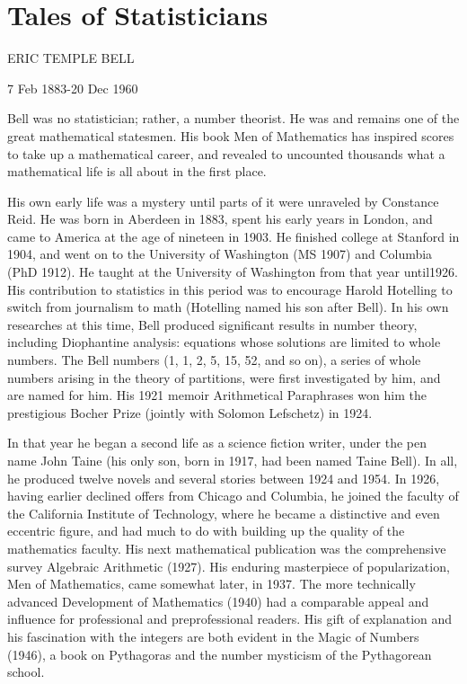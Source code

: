 \documentclass{article}
\begin{document}
\section[Tales of Statisticians]{Tales of Statisticians}
ERIC TEMPLE BELL

7 Feb 1883-20 Dec 1960

Bell was no statistician; rather, a number theorist. He was and remains one of the great mathematical statesmen. His
book Men of Mathematics has inspired scores to take up a mathematical career, and revealed to uncounted thousands what
a mathematical life is all about in the first place. 

His own early life was a mystery until parts of it were unraveled by Constance Reid. He was born in Aberdeen in 1883,
spent his early years in London, and came to America at the age of nineteen in 1903. He finished college at Stanford in
1904, and went on to the University of Washington (MS 1907) and Columbia (PhD 1912). He taught at the University of
Washington from that year until1926. His contribution to statistics in this period was to encourage Harold Hotelling to
switch from journalism to math (Hotelling named his son after Bell). In his own researches at this time, Bell produced
significant results in number theory, including Diophantine analysis: equations whose solutions are limited to whole
numbers. The Bell numbers (1, 1, 2, 5, 15, 52, and so on), a series of whole numbers arising in the theory of
partitions, were first investigated by him, and are named for him. His 1921 memoir Arithmetical Paraphrases won him the
prestigious Bocher Prize (jointly with Solomon Lefschetz) in 1924. 

In that year he began a second life as a science fiction writer, under the pen name John Taine (his only son, born in
1917, had been named Taine Bell). In all, he produced twelve novels and several stories between 1924 and 1954. In 1926,
having earlier declined offers from Chicago and Columbia, he joined the faculty of the California Institute of
Technology, where he became a distinctive and even eccentric figure, and had much to do with building up the quality of
the mathematics faculty. His next mathematical publication was the comprehensive survey Algebraic Arithmetic (1927).
His enduring masterpiece of popularization, Men of Mathematics, came somewhat later, in 1937. The more technically
advanced Development of Mathematics (1940) had a comparable appeal and influence for professional and preprofessional
readers. His gift of explanation and his fascination with the integers are both evident in the Magic of Numbers (1946),
a book on Pythagoras and the number mysticism of the Pythagorean school. 
\end{document}
